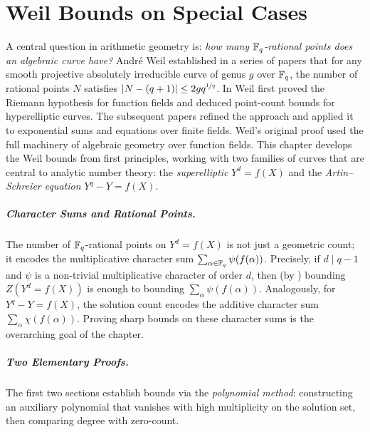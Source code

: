 \chapter{Weil Bounds on Special Cases}

A central question in arithmetic geometry is: \emph{how many $\mathbb{F}_q$-rational points does an algebraic curve have?} Andr\'{e} Weil established in a series of papers \cite{Weil1941,Weil1948,Weil1949} that for any smooth projective absolutely irreducible curve of genus $g$ over $\mathbb{F}_q$, the number of rational points $N$ satisfies $|N-(q+1)|\leq 2gq^{\nicefrac12}$. In \cite{Weil1941} Weil first proved the Riemann hypothesis for function fields and deduced point-count bounds for hyperelliptic curves. The subsequent papers \cite{Weil1948,Weil1949} refined the approach and applied it to exponential sums and equations over finite fields. Weil's original proof used the full machinery of algebraic geometry over function fields. This chapter develops the Weil bounds from first principles, working with two families of curves that are central to analytic number theory: the \emph{superelliptic} $Y^d=f(X)$ and the \emph{Artin--Schreier equation} $Y^q-Y=f(X)$.

\paragraph*{Character Sums and Rational Points.}
The number of $\mathbb{F}_q$-rational points on $Y^d=f(X)$ is not just a geometric count; it encodes the multiplicative character sum $\sum_{\alpha\in\mathbb{F}_q}\psi(f(\alpha))$. Precisely, if $d\mid q-1$ and $\psi$ is a non-trivial multiplicative character of order $d$, then (by \StepanovPsiIrrthm) bounding $Z(Y^d=f(X))$ is enough to bounding $\sum_\alpha\psi(f(\alpha))$. Analogously, for $Y^q-Y=f(X)$, the solution count encodes the additive character sum $\sum_\alpha\chi(f(\alpha))$. Proving sharp bounds on these character sums is the overarching goal of the chapter.

\paragraph*{Two Elementary Proofs.}
The first two sections establish bounds via the \emph{polynomial method}: constructing an auxiliary polynomial that vanishes with high multiplicity on the solution set, then comparing degree with zero-count.

